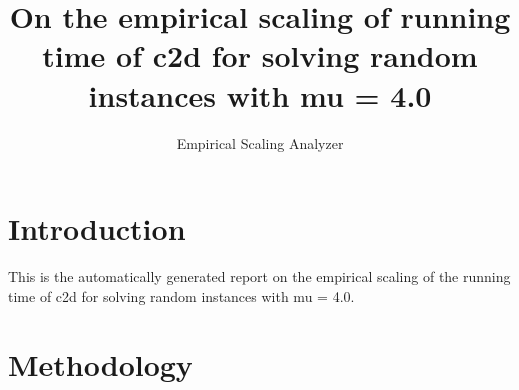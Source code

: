 \newcommand{\updatedYP}[1]{#1}
\newcommand{\yp}[1]{#1}
\newcommand{\orange}[1]{#1}
\newcommand{\evalModels}[1]{#1}
\newcommand{\bestBoot}[1]{#1}

\newcommand{\medianInterval}[1]{}
\newcommand{\randomizedAlgorithm}[1]{}
\newcommand{\quantileRegression}[1]{}
\renewcommand{\quantileRegression}[1]{#1}

\makeatletter

\providecommand{\tabularnewline}{\\}


\title{On the empirical scaling of running time of c2d for solving random instances with mu = 4.0}
\author{Empirical Scaling Analyzer}

\makeatother

\usepackage{babel}

\maketitle %


\section{Introduction}

This is the automatically generated report on the empirical scaling
of the running time of c2d for solving random instances with mu = 4.0.


\section{Methodology}

\label{sec:Methodology}

